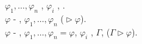 \textcyr{\CYRP\cyro\cyrs\cyrl\cyre\cyrd\cyro\cyrv\cyra\cyrt\cyre\cyrl\cyrsftsn\cyrn\cyro\cyrs\cyrt\cyrsftsn}
$\varphi_{1},\dots,\varphi_{n}$ \textcyr{\cyrn\cyra\cyrz\cyrery\cyrv\cyra\cyre\cyrt\cyrs\cyrya}
\textbf{\textcyr{\cyrd\cyro\cyrk\cyra\cyrz\cyra\cyrt\cyre\cyrl\cyrsftsn\cyrs\cyrt\cyrv\cyro\cyrm}},
\textcyr{\cyre\cyrs\cyrl\cyri} \textcyr{\cyrk\cyra\cyrzh\cyrd\cyra\cyrya}
$\varphi_{i}$ \textcyr{\cyrya\cyrv\cyrl\cyrya\cyre\cyrt\cyrs\cyrya}
\textcyr{\cyra\cyrk\cyrs\cyri\cyro\cyrm\cyro\cyrishrt}, \textcyr{\cyrl\cyri\cyrb\cyro}
\textcyr{\cyrp\cyro\cyrl\cyru\cyrch\cyre\cyrn\cyra} \textcyr{\cyri\cyrz}
\textcyr{\cyrp\cyrr\cyre\cyrd\cyrery\cyrd\cyru\cyrshch\cyri\cyrh}
\textcyr{\cyro\cyrd\cyrn\cyro\cyrk\cyrr\cyra\cyrt\cyrn\cyrery\cyrm}
\textcyr{\cyrp\cyrr\cyri\cyrm\cyre\cyrn\cyre\cyrn\cyri\cyre\cyrm}
\textcyr{\cyrp\cyrr\cyra\cyrv\cyri\cyrl\cyra} \textcyr{\cyrv\cyrery\cyrv\cyro\cyrd\cyra}.
\\
$\varphi$ - \textbf{\textcyr{\cyrd\cyro\cyrk\cyra\cyrz\cyru\cyre\cyrm\cyra}},
\textcyr{\cyre\cyrs\cyrl\cyri} \textcyr{\cyrs\cyru\cyrshch\cyre\cyrs\cyrt\cyrv\cyru\cyre\cyrt}
\textcyr{\cyrd\cyro\cyrk\cyra\cyrz\cyra\cyrt\cyre\cyrl\cyrsftsn\cyrs\cyrt\cyrv\cyro}
$\varphi_{1},\dots,\varphi_{n}$ \textcyr{\cyrz\cyra\cyrk\cyra\cyrn\cyrch\cyri\cyrv\cyra\cyryu\cyrshch\cyre\cyre\cyrs\cyrya}
\textcyr{\cyrerev\cyrt\cyro\cyrishrt} \textcyr{\cyrf\cyro\cyrr\cyrm\cyru\cyrl\cyro\cyrishrt}
($\vartriangleright\varphi$).\\
$\varphi$ -\textbf{ \textcyr{\cyrd\cyro\cyrk\cyra\cyrz\cyru\cyre\cyrm\cyra}
\textcyr{\cyri\cyrz} \textcyr{\cyrm\cyrn\cyro\cyrzh\cyre\cyrs\cyrt\cyrv\cyra}
\textcyr{\cyrf\cyro\cyrr\cyrm\cyru\cyrl}}, \textcyr{\cyre\cyrs\cyrl\cyri}
\textcyr{\cyrs\cyru\cyrshch\cyre\cyrs\cyrt\cyrv\cyru\cyre\cyrt}$\varphi_{1},\dots,\varphi_{n}=\varphi$,
\textcyr{\cyrv} \textcyr{\cyrk\cyro\cyrt\cyro\cyrr\cyro\cyrishrt}
\textcyr{\cyrk\cyra\cyrzh\cyrd\cyra\cyrya} $\varphi_{i}$ \textcyr{\cyrya\cyrv\cyrl\cyrya\cyre\cyrt\cyrs\cyrya}
\textcyr{\cyra\cyrk\cyrs\cyri\cyro\cyrm\cyro\cyrishrt}, \textcyr{\cyrl\cyri\cyrb\cyro}
\textcyr{\cyrp\cyrr\cyri\cyrn\cyra\cyrd\cyrl\cyre\cyrzh\cyri\cyrt}
\textcyr{\cyrm\cyrn\cyro\cyrzh\cyre\cyrs\cyrt\cyrv\cyru} $\Gamma$,
\textcyr{\cyrl\cyri\cyrb\cyro} \textcyr{\cyrp\cyro\cyrl\cyru\cyrch\cyre\cyrn\cyra}
\textcyr{\cyri\cyrz} \textcyr{\cyrp\cyrr\cyre\cyrd\cyrery\cyrd\cyru\cyrshch\cyri\cyrh}
\textcyr{\cyro\cyrd\cyrn\cyro\cyrk\cyrr\cyra\cyrt\cyrn\cyrery\cyrm}
\textcyr{\cyrp\cyrr\cyri\cyrm\cyre\cyrn\cyre\cyrn\cyri\cyre\cyrm}
\textcyr{\cyrp\cyrr\cyra\cyrv\cyri\cyrl\cyra} \textcyr{\cyrv\cyrery\cyrv\cyro\cyrd\cyra}
($\Gamma\vartriangleright\varphi$).

